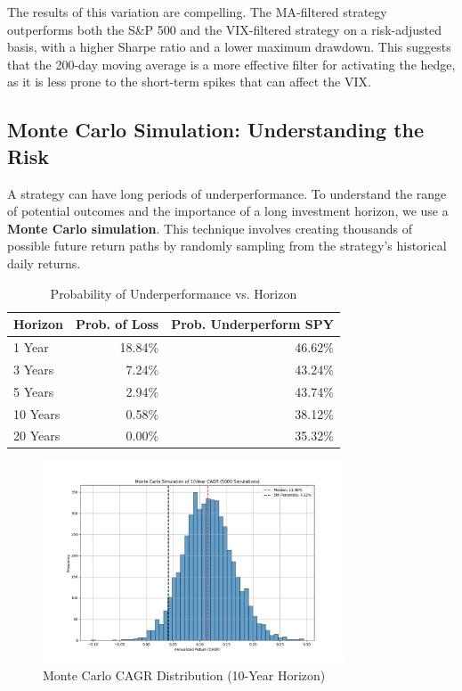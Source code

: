 \documentclass{article}
\begin{document}
The results of this variation are compelling. The MA-filtered strategy outperforms both the S\&P 500 and the VIX-filtered strategy on a risk-adjusted basis, with a higher Sharpe ratio and a lower maximum drawdown. This suggests that the 200-day moving average is a more effective filter for activating the hedge, as it is less prone to the short-term spikes that can affect the VIX.

\subsection{Monte Carlo Simulation: Understanding the Risk}
\label{sec:monte_carlo}
A strategy can have long periods of underperformance. To understand the range of potential outcomes and the importance of a long investment horizon, we use a \textbf{Monte Carlo simulation}. This technique involves creating thousands of possible future return paths by randomly sampling from the strategy's historical daily returns.

\begin{table}[htbp]
\centering
\caption{Probability of Underperformance vs. Horizon}
\begin{tabular}{lrr}
\toprule
\textbf{Horizon} & \textbf{Prob. of Loss} & \textbf{Prob. Underperform SPY} \\
\midrule
1 Year  & 18.84\%        & 46.62\%                 \\
3 Years & 7.24\%         & 43.24\%                 \\
5 Years & 2.94\%         & 43.74\%                 \\
10 Years & 0.58\%         & 38.12\%                 \\
20 Years & 0.00\%         & 35.32\%                 \\
\bottomrule
\end{tabular}
\end{table}

\begin{figure}[htbp]
\centering
\includegraphics[width=0.8\textwidth]{plot_monte_carlo.png}
\caption{Monte Carlo CAGR Distribution (10-Year Horizon)}
\end{figure}
\end{document}
